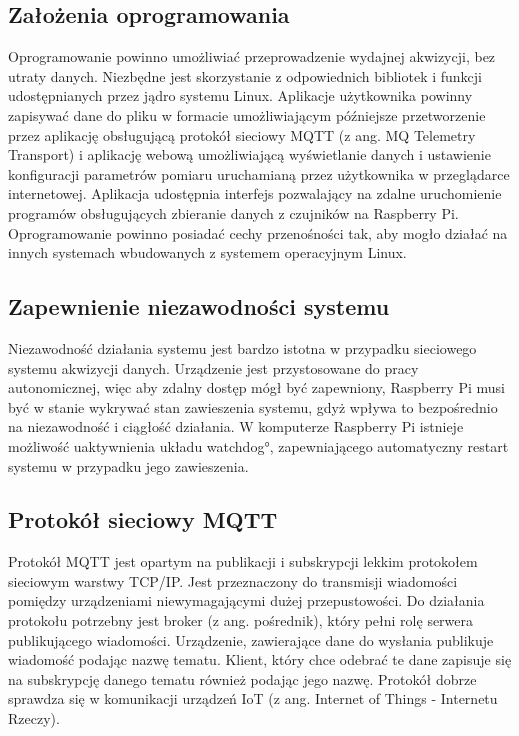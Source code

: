\subsection{Założenia oprogramowania}

Oprogramowanie powinno umożliwiać przeprowadzenie wydajnej akwizycji, bez utraty danych.
Niezbędne jest skorzystanie z odpowiednich bibliotek i funkcji udostępnianych przez jądro systemu Linux. Aplikacje użytkownika powinny zapisywać dane do pliku w formacie umożliwiającym późniejsze przetworzenie przez aplikację obsługującą protokół sieciowy MQTT (z ang. MQ Telemetry Transport) i aplikację webową umożliwiającą wyświetlanie danych i ustawienie konfiguracji parametrów pomiaru uruchamianą przez użytkownika w przeglądarce internetowej. Aplikacja udostępnia interfejs pozwalający na zdalne uruchomienie programów obsługujących zbieranie danych z czujników na Raspberry Pi. Oprogramowanie powinno posiadać cechy przenośności tak, aby mogło działać na innych systemach wbudowanych z systemem operacyjnym Linux.

\subsection{Zapewnienie niezawodności systemu}
Niezawodność działania systemu jest bardzo istotna w przypadku sieciowego systemu akwizycji danych. Urządzenie jest przystosowane do pracy autonomicznej, więc aby zdalny dostęp mógł być zapewniony, Raspberry Pi musi być w stanie wykrywać stan zawieszenia systemu, gdyż wpływa to bezpośrednio na niezawodność i ciągłość działania. 
W komputerze Raspberry Pi istnieje możliwość uaktywnienia układu \ang{watchdog}, zapewniającego automatyczny restart systemu w przypadku jego zawieszenia. 


\subsection{Protokół sieciowy MQTT}

Protokół MQTT jest opartym na publikacji i subskrypcji lekkim protokołem sieciowym warstwy TCP/IP\cite{mqtt}. Jest przeznaczony do transmisji wiadomości pomiędzy urządzeniami niewymagającymi dużej przepustowości. Do działania protokołu potrzebny jest broker (z ang. pośrednik), który pełni rolę serwera publikującego wiadomości. Urządzenie, zawierające dane do wysłania publikuje wiadomość podając nazwę tematu. Klient, który chce odebrać te dane zapisuje się na subskrypcję danego tematu również podając jego nazwę. 
Protokół dobrze sprawdza się w komunikacji urządzeń IoT (z ang. Internet of Things - Internetu Rzeczy).


